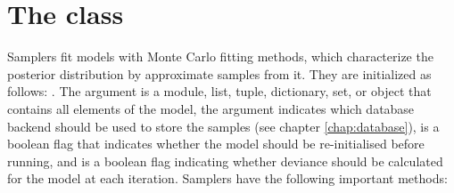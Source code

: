 \section*{The  class} \label{sec:Sampler}
Samplers fit models with Monte Carlo fitting methods, which characterize the posterior distribution by approximate samples from it. They are initialized as follows: . The  argument is a module, list, tuple, dictionary, set, or object that contains all elements of the model, the  argument indicates which database backend should be used to store the samples (see chapter \ref{chap:database}),  is a boolean flag that indicates whether the model should be re-initialised before running, and  is a boolean flag indicating whether deviance should be calculated for the model at each iteration. Samplers have the following important methods:

